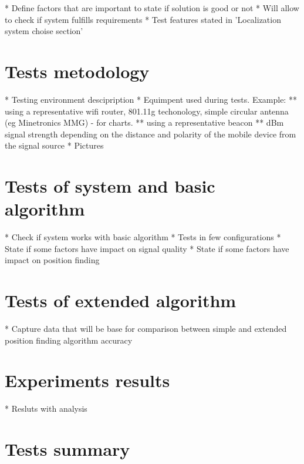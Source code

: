 \documentclass[../main.tex]{subfiles}
\begin{document}
* Define factors that are important to state if solution is good or not
* Will allow to check if system fulfills requirements
* Test features stated in 'Localization system choise section'


\section{Tests metodology} %
\label{sec:tests_metodology}

* Testing environment descipription
* Equimpent used during tests. Example:
** using a representative wifi router, 801.11g techonology, simple circular antenna (eg Minetronics MMG) - for charts.
** using a representative beacon
** dBm signal strength depending on the distance and polarity of the mobile device from the signal source
* Pictures


\section{Tests of system and basic algorithm} %
\label{sec:tests_of_system_and_basic_algorithm}

* Check if system works with basic algorithm
* Tests in few configurations
* State if some factors have impact on signal quality
* State if some factors have impact on position finding

\section{Tests of extended algorithm} %
\label{sec:tests_of_extended_algorithm}

* Capture data that will be base for comparison between simple and extended position finding algorithm accuracy


\section{Experiments results} %
\label{sec:experiments_results}

* Resluts with analysis


\section{Tests summary} %
\label{sec:tests_summary}

\end{document}

